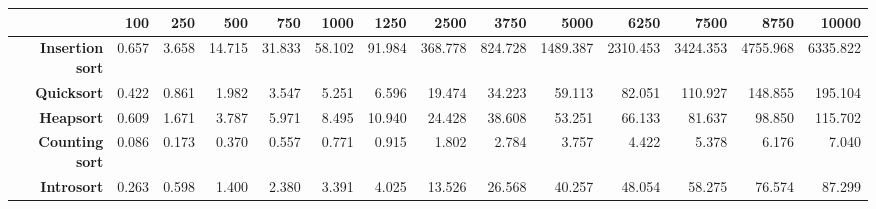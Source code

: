 \begin{tabular}{rrrrrrrrrrrrrr}
\hline
                         &   \textbf{100} &   \textbf{250} &   \textbf{500} &   \textbf{750} &   \textbf{1000} &   \textbf{1250} &   \textbf{2500} &   \textbf{3750} &   \textbf{5000} &   \textbf{6250} &   \textbf{7500} &   \textbf{8750} &   \textbf{10000} \\
\hline
 \textbf{Insertion sort} &          0.657 &          3.658 &         14.715 &         31.833 &          58.102 &          91.984 &         368.778 &         824.728 &        1489.387 &        2310.453 &        3424.353 &        4755.968 &         6335.822 \\
      \textbf{Quicksort} &          0.422 &          0.861 &          1.982 &          3.547 &           5.251 &           6.596 &          19.474 &          34.223 &          59.113 &          82.051 &         110.927 &         148.855 &          195.104 \\
       \textbf{Heapsort} &          0.609 &          1.671 &          3.787 &          5.971 &           8.495 &          10.940 &          24.428 &          38.608 &          53.251 &          66.133 &          81.637 &          98.850 &          115.702 \\
  \textbf{Counting sort} &          0.086 &          0.173 &          0.370 &          0.557 &           0.771 &           0.915 &           1.802 &           2.784 &           3.757 &           4.422 &           5.378 &           6.176 &            7.040 \\
      \textbf{Introsort} &          0.263 &          0.598 &          1.400 &          2.380 &           3.391 &           4.025 &          13.526 &          26.568 &          40.257 &          48.054 &          58.275 &          76.574 &           87.299 \\
\hline
\end{tabular}